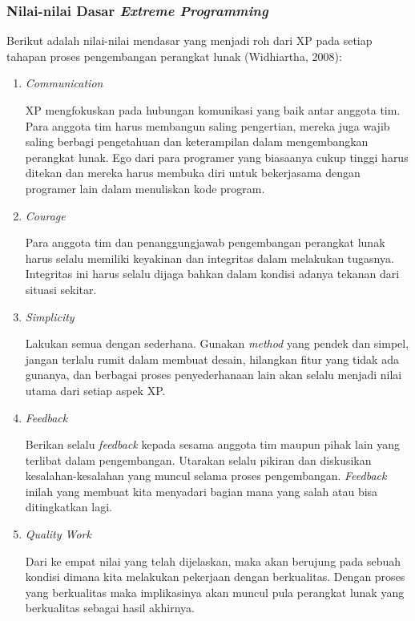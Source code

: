   \subsubsection{Nilai-nilai Dasar \emph{Extreme Programming}}
  Berikut adalah nilai-nilai mendasar yang menjadi roh dari XP pada setiap tahapan proses pengembangan perangkat lunak (Widhiartha, 2008):
  \begin{enumerate}
      \itemsep0em
      \item \emph{Communication}
      
      XP mengfokuskan pada hubungan komunikasi yang baik antar anggota tim. Para anggota tim harus membangun saling pengertian, mereka juga wajib saling berbagi pengetahuan dan keterampilan dalam mengembangkan perangkat lunak. Ego dari para programer yang biasaanya cukup tinggi harus ditekan dan mereka harus membuka diri untuk bekerjasama dengan programer lain dalam menuliskan kode program. \newline
      \item \emph{Courage}
      
      Para anggota tim dan penanggungjawab pengembangan perangkat lunak harus selalu memiliki keyakinan dan integritas dalam melakukan tugasnya. Integritas ini harus selalu dijaga bahkan dalam kondisi adanya tekanan dari situasi sekitar.
      \item \emph{Simplicity}
      
      Lakukan semua dengan sederhana. Gunakan \emph{method} yang pendek dan simpel, jangan terlalu rumit dalam membuat desain, hilangkan fitur yang tidak ada gunanya, dan berbagai proses penyederhanaan lain akan selalu menjadi nilai utama dari setiap aspek XP.
      \item \emph{Feedback}
      
      Berikan selalu \emph{feedback} kepada sesama anggota tim maupun pihak lain yang terlibat dalam pengembangan. Utarakan selalu pikiran dan diskusikan kesalahan-kesalahan yang muncul selama proses pengembangan. \emph{Feedback} inilah yang membuat kita menyadari bagian mana yang salah atau bisa ditingkatkan lagi.
      \item \emph{Quality Work}
      
      Dari ke empat nilai yang telah dijelaskan, maka akan berujung pada sebuah kondisi dimana kita melakukan pekerjaan dengan berkualitas. Dengan proses yang berkualitas maka implikasinya akan muncul pula perangkat lunak yang berkualitas sebagai hasil akhirnya.
  \end{enumerate}
  
